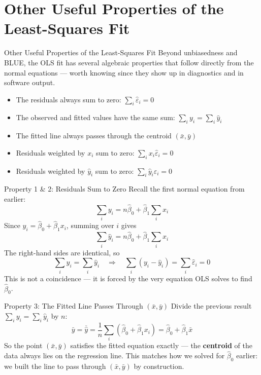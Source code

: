 \section{Other Useful Properties of the Least-Squares Fit}


\begin{frame}{Other Useful Properties of the Least-Squares Fit}
	Beyond unbiasedness and BLUE, the OLS fit has several algebraic properties that follow directly from the normal equations --- worth knowing since they show up in diagnostics and in software output.
	\svspace{0.5em}
	\begin{itemize}
		\item The residuals always sum to zero: $\sum_i \hat\varepsilon_i = 0$
		\item The observed and fitted values have the same sum: $\sum_i y_i = \sum_i \hat y_i$
		\item The fitted line always passes through the centroid $(\bar x, \bar y)$
		\item Residuals weighted by $x_i$ sum to zero: $\sum_i x_i \hat\varepsilon_i = 0$
		\item Residuals weighted by $\hat y_i$ sum to zero: $\sum_i \hat y_i \hat\varepsilon_i = 0$
	\end{itemize}
\end{frame}


\begin{frame}{Property 1 \& 2: Residuals Sum to Zero}
	Recall the first normal equation from earlier:
	\[
		\sum_i y_i = n\hat\beta_0 + \hat\beta_1\sum_i x_i
	\]
	\pause
	Since $\hat y_i = \hat\beta_0 + \hat\beta_1 x_i$, summing over $i$ gives
	\[
		\sum_i \hat y_i = n\hat\beta_0 + \hat\beta_1\sum_i x_i
	\]
	\pause
	The right-hand sides are identical, so
	\[
		\boxed{\sum_i y_i = \sum_i \hat y_i} \quad\Longrightarrow\quad \sum_i(y_i - \hat y_i) = \sum_i \hat\varepsilon_i = 0
	\]
	This is not a coincidence --- it is forced by the very equation OLS solves to find $\hat\beta_0$.
\end{frame}


\begin{frame}{Property 3: The Fitted Line Passes Through $(\bar x, \bar y)$}
	Divide the previous result $\sum_i y_i = \sum_i \hat y_i$ by $n$:
	\[
		\bar y = \overline{\hat y} = \frac{1}{n}\sum_i(\hat\beta_0 + \hat\beta_1 x_i) = \hat\beta_0 + \hat\beta_1 \bar x
	\]
	\pause
	So the point $(\bar x, \bar y)$ satisfies the fitted equation exactly --- the \textbf{centroid} of the data always lies on the regression line.
	\svspace{0.5em}
	This matches how we solved for $\hat\beta_0$ earlier: we built the line to pass through $(\bar x,\bar y)$ by construction.
\end{frame}


